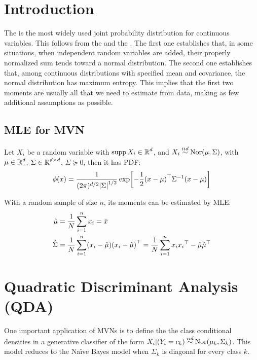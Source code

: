 
\section{Introduction}

The  is the most widely used joint probability distribution for continuous variables. This follows from the  and the . The first one establishes that, in some situations, when independent random variables are added, their properly normalized sum tends toward a normal distribution. The second one establishes that, among continuous distributions with specified mean and covariance, the normal distribution has maximum entropy. This implies that the first two moments are usually all that we need to estimate from data, making as few additional assumptions as possible.

\subsection{MLE for MVN}
Let $X_i$ be a random variable with $\operatorname{supp}{X_i}\in\operatorname{\mathbb{R}}^d$, and $X_i\dist{iid}\text{Nor}(\mu,\Sigma)$, with $\mu\in\operatorname{\mathbb{R}}^d$, $\Sigma\in\operatorname{\mathbb{R}}^{d\times d}$, $\Sigma\succeq 0$, then it has PDF:
\begin{equation*}
    \phi(x) = \frac{1}{(2\pi)^{d/2}\abs{\Sigma}^{1/2}}\exp[-\frac{1}{2}{(x-\mu)}^\top{\Sigma}^{-1}(x-\mu) ]
\end{equation*}

With a random sample of size $n$, its moments can be estimated by MLE:
\begin{align*}
    \hat{\mu} &= \frac{1}{N}\sum_{i=1}^nx_i = \bar{x}\\
    \hat{\Sigma} &= \frac{1}{N}\sum_{i=1}^n (x_i-\hat{\mu}){(x_i-\hat{\mu})}^\top = \frac{1}{N}\sum_{i=1}^n x_i{x_i}^\top-\hat{\mu}{\hat{\mu}}^\top
\end{align*}


\section{Quadratic Discriminant Analysis (QDA)}

One important application of MVNs is to define the the class conditional densities in a generative classifier of the form $X_i|(Y_i=c_k)\dist{iid}\text{Nor}(\mu_k,\Sigma_k)$. This model reduces to the Naïve Bayes model when $\Sigma_k$ is diagonal for every class $k$.